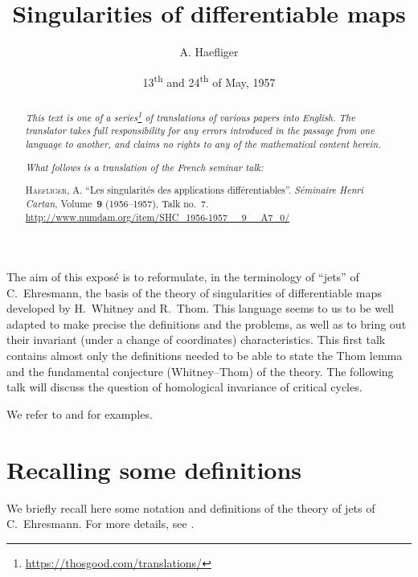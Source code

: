 \documentclass{article}
\title{Singularities of differentiable maps}
\author{A. Haefliger}
\date{13\textsuperscript{th} and 24\textsuperscript{th} of May, 1957}
\theoremstyle{plain}
\theoremstyle{definition}
\begin{document}
\maketitle
\thispagestyle{fancy}

\renewcommand{\abstractname}{Translator's note.}

\begin{abstract}
  \renewcommand*{\thefootnote}{\fnsymbol{footnote}}
  \emph{This text is one of a series\footnote{\url{https://thosgood.com/translations/}} of translations of various papers into English.}
  \emph{The translator takes full responsibility for any errors introduced in the passage from one language to another, and claims no rights to any of the mathematical content herein.}

  \medskip
  
  \emph{What follows is a translation of the French seminar talk:}

  \medskip\noindent
  \textsc{Haefliger, A.}
  ``Les singularit\'{e}s des applications diff\'{e}rentiables''.
  \emph{S\'{e}minaire Henri Cartan}, Volume~\textbf{9} (1956--1957), Talk no.~7.
  {\url{http://www.numdam.org/item/SHC_1956-1957__9__A7_0/}}
\end{abstract}

\setcounter{footnote}{0}

\tableofcontents
\bigskip



The aim of this expos\'{e} is to reformulate, in the terminology of ``jets'' of C.~Ehresmann, the basis of the theory of singularities of differentiable maps developed by H.~Whitney and R.~Thom.
This language seems to us to be well adapted to make precise the definitions and the problems, as well as to bring out their invariant (under a change of coordinates) characteristics.
This first talk contains almost only the definitions needed to be able to state the Thom lemma and the fundamental conjecture (Whitney--Thom) of the theory.
The following talk will discuss the question of homological invariance of critical cycles.

We refer to \cite{2} and \cite{7} for examples.


\section{Recalling some definitions}
\label{section1}

We briefly recall here some notation and definitions of the theory of jets of C.~Ehresmann.
For more details, see \cite{1}.
\end{document}
